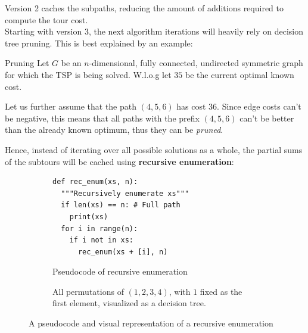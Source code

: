 Version 2 caches the subpaths, reducing the amount of additions required to compute the tour cost.\\

Starting with version 3, the next algorithm iterations will heavily rely on decision tree pruning. This is best explained by an example:

\begin{example}{Pruning}
Let $G$ be an $n$-dimensional, fully connected, undirected symmetric graph for which the \ac{TSP} is being solved. W.l.o.g let $35$ be the current optimal known cost.

Let us further assume that the path $(4,5,6)$ has cost $36$. Since edge costs can't be negative, this means that all paths with the prefix $(4,5,6)$ can't be better than the already known optimum, thus they can be \emph{pruned}.
\end{example}

Hence, instead of iterating over all possible solutions as a whole, the partial sums of the subtours will be cached using \textbf{recursive enumeration}:

\begin{figure}[H]
\centering
\begin{subfigure}[b]{0.45\textwidth}
\begin{verbatim}
def rec_enum(xs, n):
  """Recursively enumerate xs"""
  if len(xs) == n: # Full path
    print(xs)
  for i in range(n):
    if i not in xs:
      rec_enum(xs + [i], n)
\end{verbatim}
\caption{Pseudocode of recursive enumeration}
\end{subfigure}
\hfill
\begin{subfigure}[b]{0.45\textwidth}
\centering
{}
\caption{All permutations of $(1,2,3,4)$, with $1$ fixed as the first element, visualized as a decision tree.}
\end{subfigure}
\caption{A pseudocode and visual representation of a recursive enumeration}
\end{figure}

